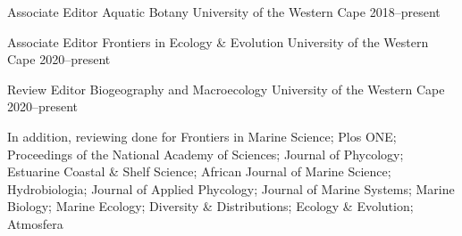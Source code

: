 


\begin{cvactivities}
    
\cvactivity
{Associate Editor} %
{Aquatic Botany} %
{University of the Western Cape} %
{2018--present} %

\cvactivity
{Associate Editor} %
{Frontiers in Ecology \& Evolution} %
{University of the Western Cape} %
{2020--present} %

\cvactivity
{Review Editor} %
{Biogeography and Macroecology} %
{University of the Western Cape} %
{2020--present} %

\end{cvactivities}

In addition, reviewing done for Frontiers in Marine Science; Plos ONE; Proceedings of the National Academy of Sciences; Journal of Phycology; Estuarine Coastal \& Shelf Science; African Journal of Marine Science; Hydrobiologia; Journal of Applied Phycology; Journal of Marine Systems; Marine Biology; Marine Ecology; Diversity \& Distributions; Ecology \& Evolution; Atmosfera
